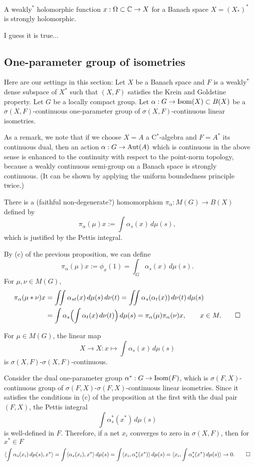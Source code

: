 \documentclass{../../small}
\begin{document}
\begin{cor*}
A weakly$^*$ holomorphic function $x:\Omega\subset\mathbb{C}\to X$ for a Banach space $X=(X_*)^*$ is strongly holomorphic.
\end{cor*}
\begin{pf}
I guess it is true...
\end{pf}



\subsection{One-parameter group of isometries}
Here are our settings in this section:
Let $X$ be a Banach space and $F$ is a weakly$^*$ dense subspace of $X^*$ such that $(X,F)$ satisfies the Krein and Goldstine property.
Let $G$ be a locally compact group.
Let $\alpha:G\to\operatorname{Isom}(X)\subset B(X)$ be a $\sigma(X,F)$-continuous one-parameter group of $\sigma(X,F)$-continuous linear isometries.

As a remark, we note that if we choose $X=A$ a C$^*$-algebra and $F=A^*$ its continuous dual, then an action $\alpha:G\to\operatorname{Aut}(A)$ which is continuous in the above sense is enhanced to the continuity with respect to the point-norm topology, because a weakly continuous semi-group on a Banach space is strongly continuous. (It can be shown by applying the uniform boundedness principle twice.)

\begin{prop}
There is a (faithful non-degenerate?) homomorphism $\pi_\alpha:M(G)\to B(X)$ defined by
\[\pi_\alpha(\mu)x:=\int\alpha_s(x)\,d\mu(s),\]
which is justified by the Pettis integral.
\end{prop}
\begin{pf}
By (c) of the previous proposition, we can define
\[\pi_\alpha(\mu)x:=\phi_x(1)=\int_G\alpha_s(x)\,d\mu(s).\]
For $\mu,\nu\in M(G)$,
\begin{align*}
\pi_\alpha(\mu*\nu)x
&=\iint\alpha_{st}(x)\,d\mu(s)\,d\nu(t)=\iint\alpha_s(\alpha_t(x))\,d\nu(t)\,d\mu(s)\\
&=\int\alpha_s\Bigl(\int\alpha_t(x)\,d\nu(t)\Bigr)\,d\mu(s)=\pi_\alpha(\mu)\pi_\alpha(\nu)x,\qquad x\in M.\qedhere
\end{align*}
\end{pf}

\begin{lem}
For $\mu\in M(G)$, the linear map
\[X\to X:x\mapsto\int\alpha_s(x)\,d\mu(s)\]
is $\sigma(X,F)$-$\sigma(X,F)$-continuous.
\end{lem}
\begin{pf}
Consider the dual one-parameter group $\alpha^*:G\to\operatorname{Isom}(F)$, which is $\sigma(F,X)$-continuous group of $\sigma(F,X)$-$\sigma(F,X)$-continuous linear isometries.
Since it satisfies the conditions in (c) of the proposition at the first with the dual pair $(F,X)$, the Pettis integral
\[\int\alpha_s^*(x^*)\,d\mu(s)\]
is well-defined in $F$.
Therefore, if a net $x_i$ converges to zero in $\sigma(X,F)$, then for $x^*\in F$
\[\langle\int\alpha_s(x_i)\,d\mu(s),x^*\rangle
=\int\langle\alpha_s(x_i),x^*\rangle\,d\mu(s)
=\int\langle x_i,\alpha_s^*(x^*)\rangle\,d\mu(s)
=\langle x_i,\int\alpha_s^*(x^*)\,d\mu(s)\rangle\to0.\qedhere\]
\end{pf}
\end{document}
